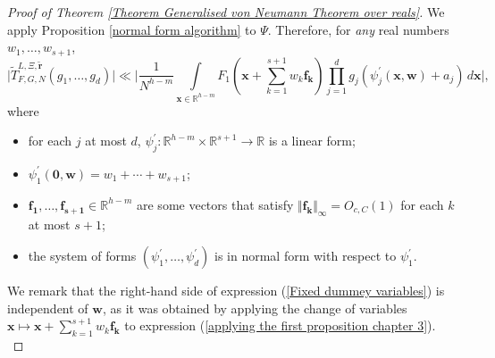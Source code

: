 \documentclass[12pt,a4paper,twoside,reqno]{amsart}
\numberwithin{equation}{section}
\begin{document}
\begin{proof}[Proof of Theorem \ref{Theorem Generalised von Neumann Theorem over reals}]
We apply Proposition \ref{normal form algorithm} to $\Psi$. Therefore, for \emph{any} real numbers $w_1,\dots,w_{s+1}$, 
\begin{equation}
\label{Fixed dummey variables}
\vert\widetilde{T}_{F,G,N}^{L,\Xi,\widetilde{\mathbf{r}}}(g_1,\dots,g_d)\vert \ll \Big\vert \frac{1}{N^{h-m}}\int\limits_{\mathbf{x} \in \mathbb{R}^{h-m}}F_1(\mathbf{x} + \sum\limits_{k=1}^{s+1} w_k \mathbf{f_k})\prod\limits_{j=1}^d g_j(\psi_j^\prime(\mathbf{x},\mathbf{w}) + a_j) \, d\mathbf{x}\Big\vert,
\end{equation}
\noindent where 
\begin{itemize}
\item for each $j$ at most $d$, $\psi^\prime_j:\mathbb{R}^{h-m} \times \mathbb{R}^{s+1}\longrightarrow \mathbb{R}$ is a linear form;
\item $\psi_1^\prime(\mathbf{0},\mathbf{w}) = w_1+\cdots+w_{s+1}$;
\item $\mathbf{f_1},\dots,\mathbf{f_{s+1}} \in \mathbb{R}^{h-m}$ are some vectors that satisfy $\Vert\mathbf{f_k}\Vert_\infty = O_{c,C}(1)$ for each $k$ at most $s+1$;
\item the system of forms $(\psi^\prime_1,\dots,\psi^\prime_d)$ is in normal form with respect to $\psi_1^\prime$. 
\end{itemize}
\noindent We remark that the right-hand side of expression (\ref{Fixed dummey variables}) is independent of $\mathbf{w}$, as it was obtained by applying the change of variables $\mathbf{x} \mapsto \mathbf{x} + \sum_{k=1}^{s+1} w_k\mathbf{f_k} $ to expression (\ref{applying the first proposition chapter 3}).\\


\end{proof}
\end{document}
